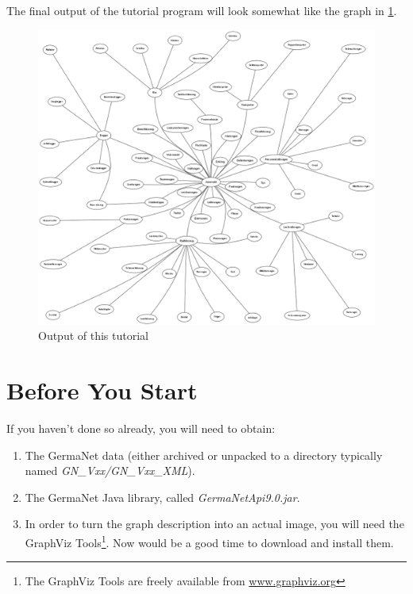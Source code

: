 \documentclass[12pt,a4paper,english,utf8]{report}
\begin{document}
The final output of the tutorial program will look somewhat like the graph in \ref{autograph}.

\begin{figure}[htb] 
	\begin{center}
		\includegraphics[scale=0.3]{auto_graph.png}
	\end{center}
	\caption{Output of this tutorial}
	\label{autograph}
\end{figure}

\section{Before You Start}
\label{tutorialStarts}
If you haven't done so already, you will need to obtain:

\renewcommand{\labelenumi}{\arabic{enumi}}
\begin{enumerate}
	\item The GermaNet data (either archived or unpacked to a directory typically named \emph{GN\_Vxx/GN\_Vxx\_XML}).
	\item The GermaNet Java library, called \emph{GermaNetApi9.0.jar}.
	\item In order to turn the graph description into an actual image, you will need the GraphViz Tools\footnote{The GraphViz Tools are freely available from \href{www.graphviz.org}{www.graphviz.org}}. Now would be a good time to download and install them.
\end{enumerate}
\end{document}

